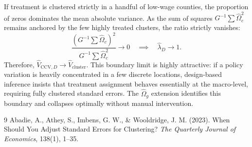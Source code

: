 \documentclass[11pt, letterpaper]{article}
\theoremstyle{remark}
\begin{document}
If treatment is clustered strictly in a handful of low-wage counties, the proportion of zeros dominates the mean absolute variance. As the sum of squares $G^{-1}\sum \widehat\Omega_c^2$ remains anchored by the few highly treated clusters, the ratio strictly vanishes:
\begin{equation*}
    \frac{\left(G^{-1}\sum \widehat\Omega_c\right)^2}{G^{-1}\sum \widehat\Omega_c^2} \longrightarrow 0 \quad \implies \quad \widehat\lambda_D \longrightarrow 1.
\end{equation*}
Therefore, $\widehat V_{\text{CCV},D} \to \widehat V_{\text{cluster}}$. This boundary limit is highly attractive: if a policy variation is heavily concentrated in a few discrete locations, design-based inference insists that treatment assignment behaves essentially at the macro-level, requiring fully clustered standard errors. The $\widehat\Omega_g$ extension identifies this boundary and collapses optimally without manual intervention.

\vspace{2em}
\begin{thebibliography}{9}
Abadie, A., Athey, S., Imbens, G. W., \& Wooldridge, J. M. (2023).
When Should You Adjust Standard Errors for Clustering?
\textit{The Quarterly Journal of Economics}, 138(1), 1--35.
\end{thebibliography}
\end{document}
